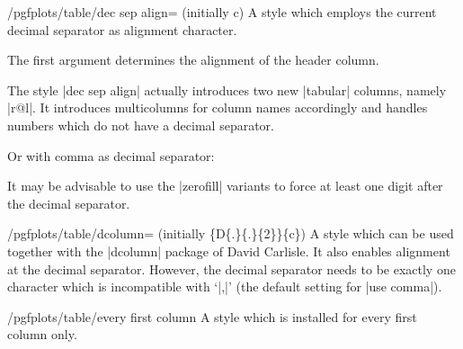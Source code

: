 \begin{stylekey}{/pgfplots/table/dec sep align= (initially c)}
	A style which employs the current decimal separator as alignment character.

	The first argument determines the alignment of the header column. 

	The style |dec sep align| actually introduces two new |tabular| columns, namely |r@{}l|. It introduces multicolumns for column names accordingly and handles numbers which do not have a decimal separator.

\begin{codeexample}[]
\end{codeexample}

	Or with comma as decimal separator:
\begin{codeexample}[]
\end{codeexample}
	It may be advisable to use the |zerofill| variants to force at least one digit after the decimal separator.
\end{stylekey}

\begin{stylekey}{/pgfplots/table/dcolumn= (initially \{D\{.\}\{.\}\{2\}\}\{c\})}
	A style which can be used together with the |dcolumn| package of David Carlisle. It also enables alignment at the decimal separator. However, the decimal separator needs to be exactly one character which is incompatible with `|{,}|' (the default setting for |use comma|).
\end{stylekey}

\begin{stylekey}{/pgfplots/table/every first column}
A style which is installed for every first column only.
\begin{codeexample}[width=7cm]
\end{codeexample}
\end{stylekey}


